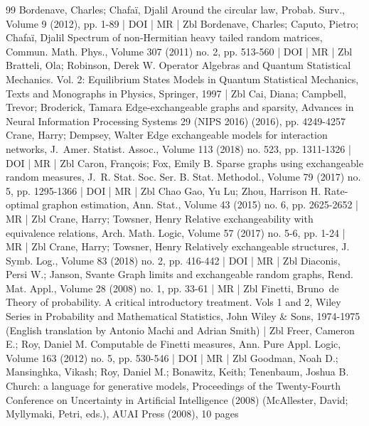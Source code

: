 \documentclass[10pt]{amsart}
\theoremstyle{definition}\newtheorem{defi}[theo]{Definition}\newtheorem{rema}[theo]{Remark}\newtheorem{exam}[theo]{Example}\newtheorem{exem}[theo]{Example}\newtheorem{nota}[theo]{Notation}
\begin{document}
\begin{thebibliography}{99}
Bordenave, Charles; Chafaï, Djalil Around the circular law, Probab. Surv., Volume 9 (2012), pp. 1-89 | DOI | MR | Zbl
Bordenave, Charles; Caputo, Pietro; Chafaï, Djalil Spectrum of non-Hermitian heavy tailed random matrices, Commun. Math. Phys., Volume 307 (2011) no. 2, pp. 513-560 | DOI | MR | Zbl
Bratteli, Ola; Robinson, Derek W. Operator Algebras and Quantum Statistical Mechanics. Vol. 2: Equilibrium States Models in Quantum Statistical Mechanics, Texts and Monographs in Physics, Springer, 1997 | Zbl
Cai, Diana; Campbell, Trevor; Broderick, Tamara Edge-exchangeable graphs and sparsity, Advances in Neural Information Processing Systems 29 (NIPS 2016) (2016), pp. 4249-4257
Crane, Harry; Dempsey, Walter Edge exchangeable models for interaction networks, J. Amer. Statist. Assoc., Volume 113 (2018) no. 523, pp. 1311-1326 | DOI | MR | Zbl
Caron, François; Fox, Emily B. Sparse graphs using exchangeable random measures, J. R. Stat. Soc. Ser. B. Stat. Methodol., Volume 79 (2017) no. 5, pp. 1295-1366 | DOI | MR | Zbl
Chao Gao, Yu Lu; Zhou, Harrison H. Rate-optimal graphon estimation, Ann. Stat., Volume 43 (2015) no. 6, pp. 2625-2652 | MR | Zbl
Crane, Harry; Towsner, Henry Relative exchangeability with equivalence relations, Arch. Math. Logic, Volume 57 (2017) no. 5-6, pp. 1-24 | MR | Zbl
Crane, Harry; Towsner, Henry Relatively exchangeable structures, J. Symb. Log., Volume 83 (2018) no. 2, pp. 416-442 | DOI | MR | Zbl
Diaconis, Persi W.; Janson, Svante Graph limits and exchangeable random graphs, Rend. Mat. Appl., Volume 28 (2008) no. 1, pp. 33-61 | MR | Zbl
Finetti, Bruno de Theory of probability. A critical introductory treatment. Vols 1 and 2, Wiley Series in Probability and Mathematical Statistics, John Wiley \& Sons, 1974-1975 (English translation by Antonio Machi and Adrian Smith) | Zbl
Freer, Cameron E.; Roy, Daniel M. Computable de Finetti measures, Ann. Pure Appl. Logic, Volume 163 (2012) no. 5, pp. 530-546 | DOI | MR | Zbl
Goodman, Noah D.; Mansinghka, Vikash; Roy, Daniel M.; Bonawitz, Keith; Tenenbaum, Joshua B. Church: a language for generative models, Proceedings of the Twenty-Fourth Conference on Uncertainty in Artificial Intelligence (2008) (McAllester, David; Myllymaki, Petri, eds.), AUAI Press (2008), 10 pages

\end{thebibliography}
\end{document}
